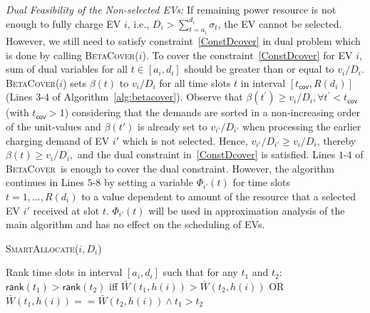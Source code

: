 \documentclass[journal]{IEEEtran}
\newcommand{\bt}[1]{{\color{blue}#1}}%
\newcommand{\bt}[1]{#1}
\newcommand{\sa}{\textsc{SmartAllocate}}
\newcommand{\bc}{\textsc{BetaCover}}
\begin{document}
		
\emph{Dual Feasibility of the Non-selected EVs:} \bt{If remaining power resource is not enough} to fully charge EV $i$, i.e.,  $D_i>\sum_{t=a_i}^{d_i}\sigma_t$, the EV cannot be selected. However, we still need to satisfy constraint~\eqref{ConstDcover} in dual problem which is done by calling \bc($i$). To cover the constraint~\eqref{ConstDcover} for EV $i$, sum of dual variables for all $t\in [a_i ,d_i]$ should be greater than or equal to ${v_i \slash D_i}$. \bc($i$) sets $\beta (t)$ to ${v_i \slash D_i}$ for all time slots $t$ in interval $[t_\mathsf{cov}, R(d_i)]$ (Lines $3$-$4$ of Algorithm~\ref{alg:betacover}). Observe that  ${\beta (t^\prime)\geq v_i \slash D_i,\forall t^\prime< t_\mathsf{cov}}$ (with $ t_\mathsf{cov}>1$) considering that the demands are sorted in a non-increasing order of the unit-values and $\beta (t')$ is already set to ${v_{i'} \slash D_{i'}}$ when processing the earlier charging demand of EV $i'$ which is not selected. Hence, ${v_{i'}\slash  D_{i'}\geq v_i \slash D_i}$, thereby ${\beta (t)\geq v_i \slash D_i,}$ and the dual constraint in~\eqref{ConstDcover} is satisfied.		
		Lines $1$-$4$ of \bc\ is enough to cover the dual constraint. However, the algorithm continues in Lines $5$-$8$ by setting a variable $\Phi_{i'}(t)$ for time slots $t=1,\dots ,R(d_i)$ to a value dependent to amount of the resource that a selected EV $i'$ received at slot $t$. $\Phi_{i'}(t)$ will be used in approximation analysis of the main algorithm and has no effect on the scheduling of EVs. 
		\begin{algorithm}%
			\footnotesize
			\caption{\sa($i,D_i$)}
			\label{SmartAllocate}
			\DontPrintSemicolon 
			
			Rank time slots in interval $[a_i,d_i]$ such that for any $t_1$ and $t_2$:
			$\mathsf{rank}(t_1)> \mathsf{rank}(t_2)$ iff $\bar{W}(t_1,h(i))>\bar{W}(t_2,h(i))$ OR $\bar{W}(t_1,h(i))==\bar{W}(t_2,h(i)) \wedge t_1>t_2$ 
			
		\end{algorithm}	
\end{document}
